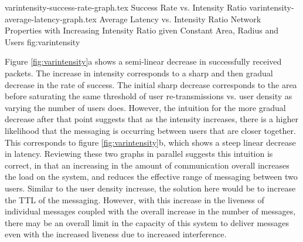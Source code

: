 \sidebysidefigures
{varintensity-success-rate-graph.tex}      {Success Rate vs. Intensity Ratio}
{varintensity-average-latency-graph.tex}   {Average Latency vs. Intensity Ratio}
{Network Properties with Increasing Intensity Ratio given Constant Area, Radius and Users}
{fig:varintensity}

Figure \ref{fig:varintensity}a shows a semi-linear decrease in successfully received packets.
The increase in intensity corresponds to a sharp and then gradual decrease in the rate of success.
The initial sharp decrease corresponds to the area before saturating the same threshold of
user re-transmissions vs. user density as varying the number of users does. However, the intuition
for the more gradual decrease after that point suggests that as the intensity increases, there
is a higher likelihood that the messaging is occurring between users that are closer together.
This corresponds to figure \ref{fig:varintensity}b, which shows a steep linear decrease in latency.
Reviewing these two graphs in parallel suggests this intuition is correct, in that an increasing
in the amount of communication overall increases the load on the system, and reduces the effective
range of messaging between two users. Similar to the user density increase, the solution here
would be to increase the TTL of the messaging. However, with this increase in the liveness of
individual messages coupled with the overall increase in the number of messages, there may be an
overall limit in the capacity of this system to deliver messages even with the increased liveness
due to increased interference.
